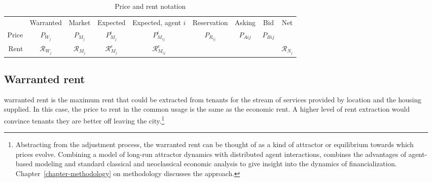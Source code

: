 \begin{table}[!ht]
\centering
{\renewcommand{\arraystretch}{1.6}
\begin{tabular}{r|c|c|c|c|c|c|c|c|}\cline{2-9}
       & Warranted  & Market & Expected &  Expected, agent $i$ & Reservation & Asking & Bid &Net    \\ \cline{2-9}
Price  & $P_{W_j}$      & $P_{M_j}$  & $P_{M_j}^\epsilon$ & $P_{M_{ij}}^{\epsilon}$     & $P_{R_{ij}}$       & $P_{A{ij}}$  & $P_{B{ij}}$ &  \\ \cline{2-9}
Rent  & $\mathcal{R}_{W_j}$      & $\mathcal{R}_{M_j}$  & $\mathcal{R}_{M_j}^\epsilon$ & $\mathcal{R}_{M_{ij}}^{\epsilon}$     &       &   &  & $\mathcal{R}_{N_j} $\\ \cline{2-9}
\end{tabular}
 }   

\caption{Price and rent notation}
\label{table-price-notation}
\end{table}




\subsection{Warranted rent}\label{sec:warranted-rent}
\Gls{warranted rent} is the maximum rent that could be extracted from tenants for the stream of services provided by location and the housing supplied. In this case, the price to rent in the common usage is the same as the economic rent. A higher level of rent extraction would convince tenants they are better off leaving the city.\footnote{Abstracting from the adjustment process, the warranted rent can be thought of as a kind of \gls{attractor} or \gls{equilibrium} towards which prices evolve.  %
Combining a model of long-run attractor dynamics with distributed agent interactions, combines the advantages of agent-based modeling and standard \gls{classical} and \gls{neoclassical} economic analysis to give insight into the dynamics of financialization. Chapter~\ref{chapter-methodology} on methodology discusses the approach.} 

